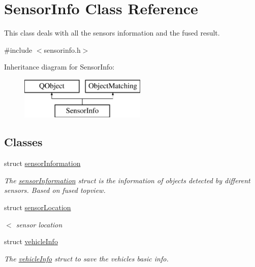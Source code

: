 \hypertarget{class_sensor_info}{}\section{Sensor\+Info Class Reference}
\label{class_sensor_info}


This class deals with all the sensors\textquotesingle{} information and the fused result.  




{\ttfamily \#include $<$sensorinfo.\+h$>$}

Inheritance diagram for Sensor\+Info\+:\begin{figure}[H]
\begin{center}
\leavevmode
\includegraphics[height=2.000000cm]{class_sensor_info}
\end{center}
\end{figure}
\subsection*{Classes}
\begin{DoxyCompactItemize}
\item 
struct \hyperlink{struct_sensor_info_1_1sensor_information}{sensor\+Information}
\begin{DoxyCompactList}\small\item\em The \hyperlink{struct_sensor_info_1_1sensor_information}{sensor\+Information} struct is the information of objects detected by different sensors. Based on fused topview. \end{DoxyCompactList}\item 
struct \hyperlink{struct_sensor_info_1_1sensor_location}{sensor\+Location}
\begin{DoxyCompactList}\small\item\em $<$ sensor location \end{DoxyCompactList}\item 
struct \hyperlink{struct_sensor_info_1_1vehicle_info}{vehicle\+Info}
\begin{DoxyCompactList}\small\item\em The \hyperlink{struct_sensor_info_1_1vehicle_info}{vehicle\+Info} struct to save the vehicle\textquotesingle{}s basic info. \end{DoxyCompactList}\end{DoxyCompactItemize}
